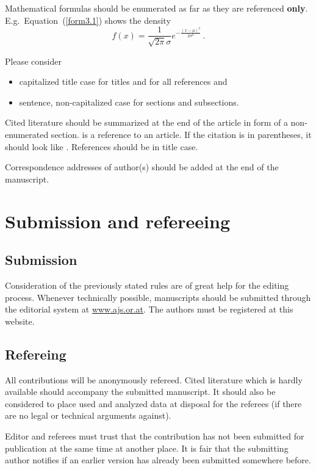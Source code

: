 \documentclass[article]{ajs}
\begin{document}
Mathematical formulas should be enumerated as far as they are
referenced \textbf{only}. E.g.~Equation~(\ref{form3.1}) shows the density 
\begin{equation}\label{form3.1}
f(x) =
\frac1{\sqrt{2\pi}\sigma}e^{-\frac{(x-\mu)^2}{2\sigma^2}}\,.
\end{equation}

Please consider 

\begin{itemize}
\item  capitalized title case for titles and for all references and 
\item sentence, non-capitalized case for sections and subsections.
\end{itemize}


Cited literature should be summarized at the end of the article in
form of a non-enumerated section. \cite{leisch02} is a reference
to an article. If the citation is in parentheses, it
should look like \citep{leisch02}.
References should be in title case.

Correspondence addresses of author(s) should be added at the end
of the manuscript. 


\section{Submission and refereeing}


\subsection{Submission}

Consideration of the previously stated rules are of great help for
the editing process. Whenever technically possible, manuscripts
should be submitted through the editorial system at \href{www.ajs.or.at}{www.ajs.or.at}. The authors must be registered at this website.

\subsection{Refereing}

All contributions will be anonymously refereed. Cited literature which is
hardly available should accompany the submitted manuscript. It
should also be considered to place used and analyzed data at
disposal for the referees (if there are no legal or technical
arguments against).

Editor and referees must trust that the contribution has not been
submitted for publication at the same time at another place. It is
fair that the submitting author notifies if an earlier version has
already been submitted somewhere before.
\end{document}
